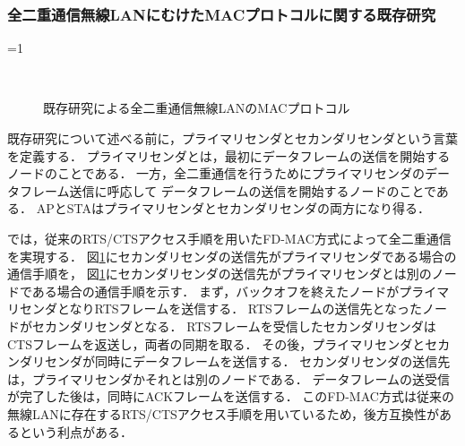 \documentclass[master]{kuisthesis}		%
\newcounter{flagFig}
\begin{document}
		\subsubsection{全二重通信無線LANにむけたMACプロトコルに関する既存研究}\label{sec:mac_problem}

			\ifnum\value{flagFig}=1 {\begin{figure}[htbp]
				\begin{center}
						\\
						\caption{既存研究\cite{fdmac}による全二重通信無線LANのMACプロトコル}
						\label{fig:fdmac_protocol}
				\end{center}
			\end{figure}}\fi

			既存研究について述べる前に，プライマリセンダとセカンダリセンダという言葉を定義する．
			プライマリセンダとは，最初にデータフレームの送信を開始するノードのことである．
			一方，全二重通信を行うためにプライマリセンダのデータフレーム送信に呼応して
			データフレームの送信を開始するノードのことである．
			APとSTAはプライマリセンダとセカンダリセンダの両方になり得る．
			\par
			\cite{fdmac}では，従来のRTS/CTSアクセス手順を用いたFD-MAC方式によって全二重通信を実現する．
			図\ref{fig:fdmac_protocol}にセカンダリセンダの送信先がプライマリセンダである場合の通信手順を，
			図\ref{fig:fdmac_protocol}にセカンダリセンダの送信先がプライマリセンダとは別のノードである場合の通信手順を示す．
			まず，バックオフを終えたノードがプライマリセンダとなりRTSフレームを送信する．
			RTSフレームの送信先となったノードがセカンダリセンダとなる．
			RTSフレームを受信したセカンダリセンダはCTSフレームを返送し，両者の同期を取る．
			その後，プライマリセンダとセカンダリセンダが同時にデータフレームを送信する．
			セカンダリセンダの送信先は，プライマリセンダかそれとは別のノードである．
			データフレームの送受信が完了した後は，同時にACKフレームを送信する．
			このFD-MAC方式は従来の無線LANに存在するRTS/CTSアクセス手順を用いているため，後方互換性があるという利点がある．
\end{document}
